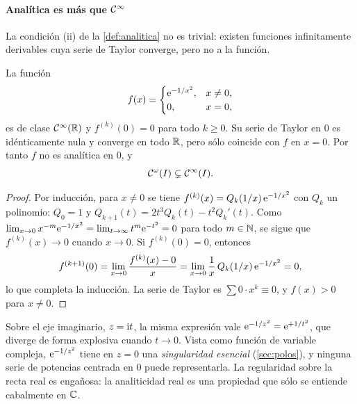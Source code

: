 \paragraph{Analítica es más que $\mathcal{C}^{\infty}$}
La condición (ii) de la \cref{def:analitica} no es trivial: existen funciones
infinitamente derivables cuya serie de Taylor converge, pero no a la función.

\begin{proposicion}\label{prop:suave}
La función
\begin{equation}\label{eq:suave}
  f(x)=\begin{cases}\mathrm{e}^{-1/x^{2}}, & x\neq0,\\ 0, & x=0,\end{cases}
\end{equation}
es de clase $\mathcal{C}^{\infty}(\mathbb{R})$ y $f^{(k)}(0)=0$ para todo $k\ge0$. Su serie de
Taylor en $0$ es idénticamente nula y converge en todo $\mathbb{R}$, pero sólo
coincide con $f$ en $x=0$. Por tanto $f$ no es analítica en $0$, y
\[
  \mathcal{C}^{\omega}(I)\subsetneq\mathcal{C}^{\infty}(I).
\]
\end{proposicion}

\begin{proof}
Por inducción, para $x\neq0$ se tiene $f^{(k)}(x)=Q_k(1/x)\,\mathrm{e}^{-1/x^{2}}$
con $Q_k$ un polinomio: $Q_0=1$ y
$Q_{k+1}(t)=2t^{3}Q_k(t)-t^{2}Q_k'(t)$. Como
$\lim_{x\to0}x^{-m}\mathrm{e}^{-1/x^{2}}=\lim_{t\to\infty}t^{m}\mathrm{e}^{-t^{2}}=0$
para todo $m\in\mathbb{N}$, se sigue que $f^{(k)}(x)\to0$ cuando $x\to0$. Si
$f^{(k)}(0)=0$, entonces
\[
  f^{(k+1)}(0)=\lim_{x\to0}\frac{f^{(k)}(x)-0}{x}
  =\lim_{x\to0}\frac1x\,Q_k(1/x)\,\mathrm{e}^{-1/x^{2}}=0,
\]
lo que completa la inducción. La serie de Taylor es $\sum 0\cdot x^k\equiv0$,
y $f(x)>0$ para $x\neq0$.
\end{proof}



\begin{observacion}\label{obs:suave-complejo}
Sobre el eje imaginario, $z=\mathrm{i} t$, la misma expresión vale
$\mathrm{e}^{-1/z^{2}}=\mathrm{e}^{+1/t^{2}}$, que diverge de forma explosiva cuando
$t\to0$. Vista como función de variable compleja, $\mathrm{e}^{-1/z^2}$ tiene en
$z=0$ una \emph{singularidad esencial} (\cref{sec:polos}), y ninguna serie
de potencias centrada en $0$ puede representarla. La regularidad sobre la
recta real es engañosa: la analiticidad real es una propiedad que sólo se
entiende cabalmente en $\mathbb{C}$.
\end{observacion}

